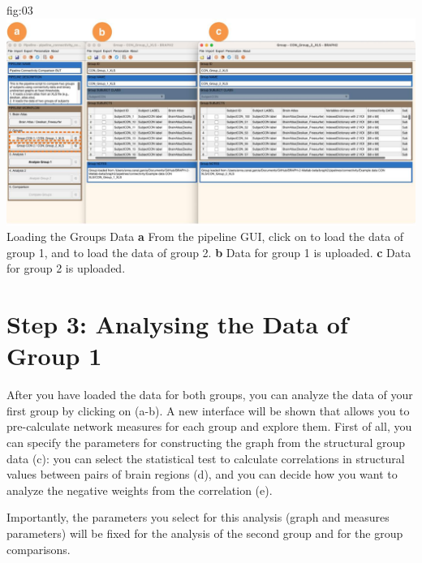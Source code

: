 \documentclass[justified]{tufte-handout}
\begin{document}
	{fig:03}
	{
	\includegraphics{fig03_medium.jpg}
	}
	{Loading the Groups Data}
	{
	{\bf a} From the pipeline GUI, click on  to load the data of group 1, and  to load the data of group 2.
	{\bf b} Data for group 1 is uploaded. {\bf c} Data for group 2 is uploaded.
	}

\section{Step 3: Analysing the Data of Group 1}
 
After you have loaded the data for both groups, you can analyze the data of your first group by clicking on  (a-b). A new interface will be shown that allows you to pre-calculate network measures for each group and explore them. First of all, you can specify the parameters for constructing the graph from the structural group data (c): you can select the statistical test to calculate correlations in structural values between pairs of brain regions (d), and you can decide how you want to analyze the negative weights from the correlation (e). 

Importantly, the parameters you select for this analysis (graph and measures parameters) will be fixed for the analysis of the second group and for the group comparisons.
\end{document}
